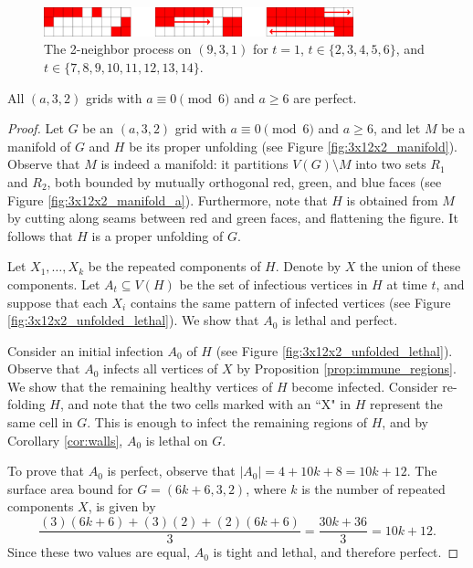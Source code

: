 \begin{figure}[]
\centering
\includegraphics[width=0.8\textwidth]{figures/7/3x9x1.pdf}
\caption{The 2-neighbor process on $(9,3,1)$ for $t=1$, $t \in \{2,3,4,5,6\}$, and $t \in \{7,8,9,10,11,12,13,14\}$.}
\label{fig:9x3x1}
\end{figure} 

\begin{con}
\label{con:3x2xa_mod6}
All $(a,3,2)$ grids with $a \equiv 0 \pmod 6$ and $a \geq 6$ are perfect. 
\end{con}

\begin{proof}
Let $G$ be an $(a,3,2)$ grid with $a \equiv 0 \pmod 6$ and $a \geq 6$, and let $M$ be a manifold of $G$ and $H$ be its proper unfolding (see Figure \ref{fig:3x12x2_manifold}). Observe that $M$ is indeed a manifold: it partitions $V(G) \setminus M$ into two sets $R_1$ and $R_2$, both bounded by mutually orthogonal red, green, and blue faces (see Figure \ref{fig:3x12x2_manifold_a}). Furthermore, note that $H$ is obtained from $M$ by cutting along seams between red and green faces, and flattening the figure. It follows that $H$ is a proper unfolding of $G$. 

Let $X_1, \dots, X_k$ be the repeated components of $H$. Denote by $X$ the union of these components. Let $A_t \subseteq V(H)$ be the set of infectious vertices in $H$ at time $t$, and suppose that each $X_i$ contains the same pattern of infected vertices (see Figure \ref{fig:3x12x2_unfolded_lethal}). We show that $A_0$ is lethal and perfect.

Consider an initial infection $A_0$ of $H$ (see Figure \ref{fig:3x12x2_unfolded_lethal}). Observe that $A_0$ infects all vertices of $X$ by Proposition \ref{prop:immune_regions}. We show that the remaining healthy vertices of $H$ become infected. Consider re-folding $H$, and note that the two cells marked with an ``X" in $H$ represent the same cell in $G$. This is enough to infect the remaining regions of $H$, and by Corollary \ref{cor:walls}, $A_0$ is lethal on $G$. 

To prove that $A_0$ is perfect, observe that $|A_0| = 4 + 10k + 8 = 10k +12$. The surface area bound for $G=(6k+6,3,2)$, where $k$ is the number of repeated components $X$, is given by
$$\frac{(3)(6k+6) + (3)(2) + (2)(6k+6)}{3} = \frac{30k + 36}{3} = 10k+12.$$
Since these two values are equal, $A_0$ is tight and lethal, and therefore perfect.
\end{proof}

